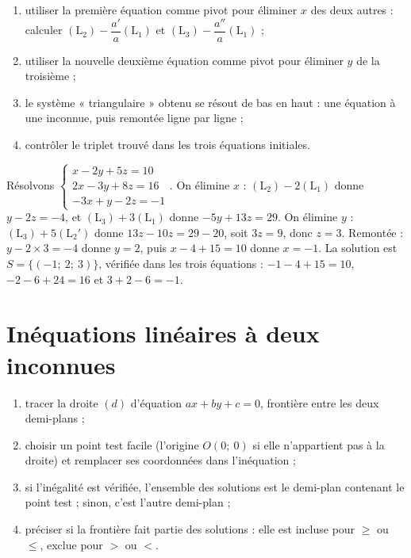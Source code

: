 \begin{methode}
\begin{enumerate}
  \item utiliser la première équation comme pivot pour éliminer $x$ des deux autres : calculer $(\text{L}_{2}) - \dfrac{a'}{a}(\text{L}_{1})$ et $(\text{L}_{3}) - \dfrac{a''}{a}(\text{L}_{1})$ ;
  \item utiliser la nouvelle deuxième équation comme pivot pour éliminer $y$ de la troisième ;
  \item le système « triangulaire » obtenu se résout de bas en haut : une équation à une inconnue, puis remontée ligne par ligne ;
  \item contrôler le triplet trouvé dans les trois équations initiales.
\end{enumerate}
\end{methode}

\begin{exemple}
Résolvons $\begin{cases}x - 2y + 5z = 10\\ 2x - 3y + 8z = 16\\ -3x + y - 2z = -1\end{cases}$. On élimine $x$ : $(\text{L}_{2}) - 2(\text{L}_{1})$ donne $y - 2z = -4$, et $(\text{L}_{3}) + 3(\text{L}_{1})$ donne $-5y + 13z = 29$. On élimine $y$ : $(\text{L}_{3}) + 5(\text{L}_{2}')$ donne $13z - 10z = 29 - 20$, soit $3z = 9$, donc $z = 3$. Remontée : $y - 2 \times 3 = -4$ donne $y = 2$, puis $x - 4 + 15 = 10$ donne $x = -1$. La solution est $S = \{(-1;\ 2;\ 3)\}$, vérifiée dans les trois équations : $-1 - 4 + 15 = 10$, $-2 - 6 + 24 = 16$ et $3 + 2 - 6 = -1$.
\end{exemple}

\section{Inéquations linéaires à deux inconnues}

\begin{methode}
\begin{enumerate}
  \item tracer la droite $(d)$ d'équation $ax + by + c = 0$, frontière entre les deux demi-plans ;
  \item choisir un point test facile (l'origine $O(0;\ 0)$ si elle n'appartient pas à la droite) et remplacer ses coordonnées dans l'inéquation ;
  \item si l'inégalité est vérifiée, l'ensemble des solutions est le demi-plan contenant le point test ; sinon, c'est l'autre demi-plan ;
  \item préciser si la frontière fait partie des solutions : elle est incluse pour $\geqslant$ ou $\leqslant$, exclue pour $>$ ou $<$.
\end{enumerate}
\end{methode}

